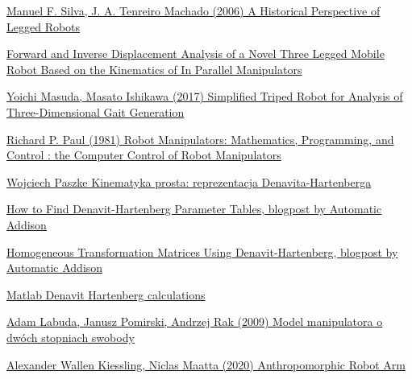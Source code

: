\documentclass[a4paper,13pt]{article}
\begin{document}
\begin{thebibliography}{9}

\href{https://www.researchgate.net/publication/258995388_A_Historical_Perspective_of_Legged_Robots}{Manuel F. Silva, J. A. Tenreiro Machado (2006) A Historical Perspective of Legged Robots}

\href{http://www.romela.org/wp-content/uploads/2015/05/Forward-and-Inverse-Displacement-Analysis-of-a-Novel-Three-Legged-Mobile-Robot-Based-on-the-Kinematics-of-In-Parallel-Manipulators.pdf}{Forward and Inverse Displacement Analysis of a Novel Three Legged Mobile Robot Based on the Kinematics of In Parallel Manipulators}

\href{https://www.jstage.jst.go.jp/article/jrobomech/29/3/29_528/_pdf}{Yoichi Masuda, Masato Ishikawa (2017) Simplified Triped Robot for Analysis of Three-Dimensional Gait Generation}

\href{https://books.google.pl/books?id=UzZ3LAYqvRkC&redir_esc=y}{Richard P. Paul (1981) Robot Manipulators: Mathematics, Programming, and Control : the Computer Control of Robot Manipulators}

\href{http://staff.uz.zgora.pl/wpaszke/materialy/air/PRwyklad_4.pdf}{Wojciech Paszke Kinematyka prosta: reprezentacja Denavita-Hartenberga}

\href{https://automaticaddison.com/how-to-find-denavit-hartenberg-parameter-tables/}{How to Find Denavit-Hartenberg Parameter Tables, blogpost by Automatic Addison}

\href{https://automaticaddison.com/homogeneous-transformation-matrices-using-denavit-hartenberg/}{Homogeneous Transformation Matrices Using Denavit-Hartenberg, blogpost by Automatic Addison}

\href{./DH_calculations.m}{Matlab Denavit Hartenberg calculations}

\href{https://sj.umg.edu.pl/sites/default/files/ZN20.pdf}{Adam Labuda, Janusz Pomirski, Andrzej Rak (2009) Model manipulatora o dwóch stopniach swobody}


\bibitem{}
\href{https://www.diva-portal.org/smash/get/diva2:1462059/FULLTEXT01.pdf}{Alexander Wallen Kiessling, Niclas Maatta (2020) Anthropomorphic Robot Arm}

\end{thebibliography}
\end{document}
